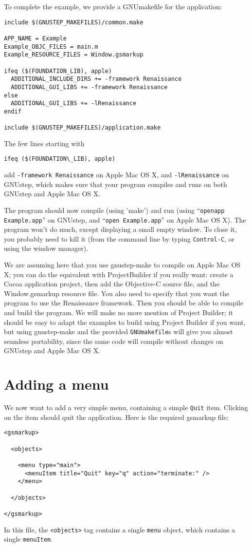 \documentclass[a4paper]{article}
\begin{document}
To complete the example, we provide a GNUmakefile for the application:
\begin{verbatim}
include $(GNUSTEP_MAKEFILES)/common.make

APP_NAME = Example
Example_OBJC_FILES = main.m
Example_RESOURCE_FILES = Window.gsmarkup

ifeq ($(FOUNDATION_LIB), apple)
  ADDITIONAL_INCLUDE_DIRS += -framework Renaissance
  ADDITIONAL_GUI_LIBS += -framework Renaissance
else
  ADDITIONAL_GUI_LIBS += -lRenaissance
endif

include $(GNUSTEP_MAKEFILES)/application.make
\end{verbatim}
The few lines starting with 
\begin{verbatim}
ifeq ($(FOUNDATION\_LIB), apple)
\end{verbatim}
add \texttt{-framework Renaissance} on Apple Mac OS X, and
\texttt{-lRenaissance} on GNUstep, which makes sure that your program
compiles and runs on both GNUstep and Apple Mac OS X.

The program should now compile (using 'make') and run (using
``\texttt{openapp Example.app}'' on GNUstep, and ``\texttt{open
Example.app}'' on Apple Mac OS X).  The program won't do much, except
displaying a small empty window.  To close it, you probably need to
kill it (from the command line by typing \texttt{Control-C}, or using
the window manager).

We are assuming here that you use gnustep-make to compile on Apple
Mac OS X; you can do the equivalent with ProjectBuilder if you really want:
create a Cocoa application project, then add the Objective-C source
file, and the Window.gsmarkup resource file.  You also need to specify
that you want the program to use the Renaissance framework.  Then you
should be able to compile and build the program.  We will make no more
mention of Project Builder; it should be easy to adapt the examples to
build using Project Builder if you want, but using gnustep-make and
the provided \texttt{GNUmakefile}s will give you almost seamless
portability, since the same code will compile without changes on
GNUstep and Apple Mac OS X.

\section{Adding a menu}
We now want to add a very simple menu, containing a simple
\texttt{Quit} item.  Clicking on the item should quit the application.
Here is the required gsmarkup file:
\begin{verbatim}
<gsmarkup>

  <objects>

    <menu type="main">
      <menuItem title="Quit" key="q" action="terminate:" />
    </menu>
 
  </objects>

</gsmarkup>
\end{verbatim}
In this file, the \texttt{<objects>} tag contains a single
\texttt{menu} object, which contains a single \texttt{menuItem}.
\end{document}
